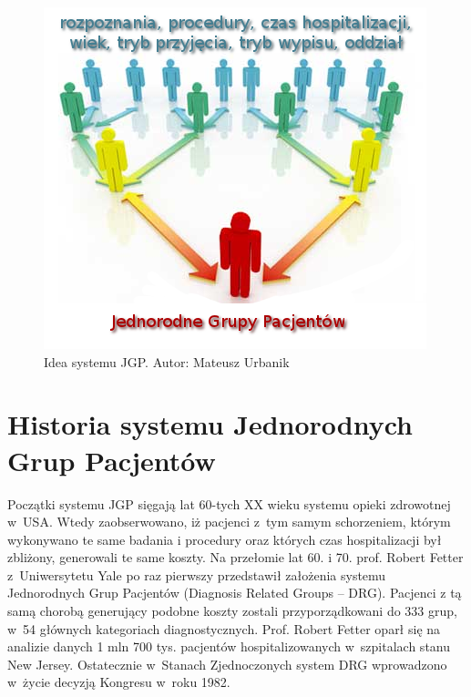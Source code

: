 \vspace*{1cm}
\begin{figure}[!ht]
\label{img:rysunek_jgp}
\includegraphics{images/standarization}
\caption[Rysunek przedstawiający ideę systemu JGP]{Idea systemu JGP. Autor: Mateusz Urbanik}
\end{figure}


\section{Historia systemu Jednorodnych Grup Pacjentów}
\label{sec:historiaJGP}

Początki systemu JGP sięgają lat 60-tych XX wieku systemu opieki zdrowotnej w~USA. Wtedy zaobserwowano, iż pacjenci z~tym samym schorzeniem, którym wykonywano te same badania i procedury oraz których czas hospitalizacji był zbliżony, generowali te same koszty. Na przełomie lat 60. i 70. prof. Robert Fetter z~Uniwersytetu Yale po raz pierwszy przedstawił założenia systemu Jednorodnych Grup Pacjentów (Diagnosis Related Groups – DRG). Pacjenci z tą samą chorobą generujący podobne koszty zostali przyporządkowani do 333 grup, w~54 głównych kategoriach diagnostycznych. Prof. Robert Fetter oparł się na analizie danych 1 mln 700 tys. pacjentów hospitalizowanych w~szpitalach stanu New Jersey. Ostatecznie w~Stanach Zjednoczonych system DRG wprowadzono w~życie decyzją Kongresu w~roku 1982\cite{kozierkiewicz_jgp}.

